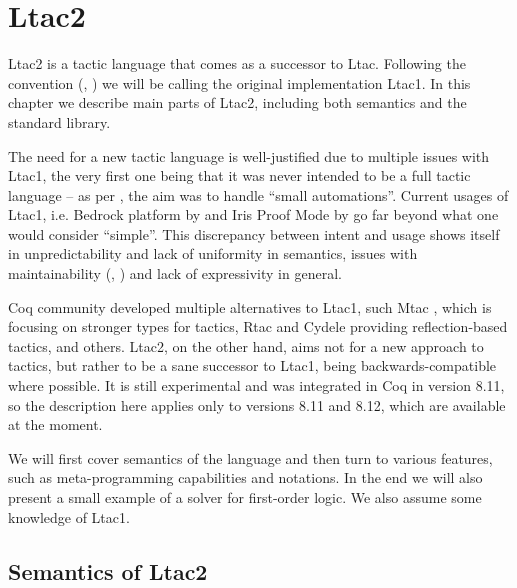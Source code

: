 \chapter{Ltac2}

Ltac2 is a tactic language that comes as a successor to Ltac.
Following the convention (\cite[Section 3.3.2]{thecoqdevelopmentteamCoqProofAssistant2020}, \cite{pedrotLtac2TacticalWarfare2019}) we will be calling the original implementation Ltac1.
In this chapter we describe main parts of Ltac2, including both semantics and the standard library.

The need for a new tactic language is well-justified due to multiple issues with Ltac1, the very first one being that it was never intended to be a full tactic language -- as per \citet{pedrotCoqHoTTminuteTickingClockwork2016}, the aim was to handle ``small automations''.
Current usages of Ltac1, i.e. Bedrock platform by \citet{chlipalaMostlyautomatedVerificationLowlevel2011} and Iris Proof Mode by \citet{krebbersInteractiveProofsHigherorder2017, krebbersMoSeLGeneralExtensible2018} go far beyond what one would consider ``simple''.
This discrepancy between intent and usage shows itself in unpredictability and lack of uniformity in semantics, issues with maintainability (\cite[Section 3.3.2]{thecoqdevelopmentteamCoqProofAssistant2020}, \cite{pedrotLtac2TacticalWarfare2019}) and lack of expressivity in general.

Coq community developed multiple alternatives to Ltac1, such Mtac \cite*{zilianiMtacMonadTyped2013, kaiserMtac2TypedTactics2018a}, which is focusing on stronger types for tactics,
Rtac \cite{malechaExtensibleEfficientAutomation2016} and Cydele \cite{claretLightweightProofReflection2013} providing reflection-based tactics, and others.
Ltac2, on the other hand, aims not for a new approach to tactics, but rather to be a sane successor to Ltac1, being backwards-compatible where possible.
It is still experimental and was integrated in Coq in version 8.11, so the description here applies only to versions 8.11 and 8.12, which are available at the moment.

We will first cover semantics of the language and then turn to various features, such as meta-programming capabilities and notations.
In the end we will also present a small example of a solver for first-order logic.
We also assume some knowledge of Ltac1.

\section{Semantics of Ltac2}

